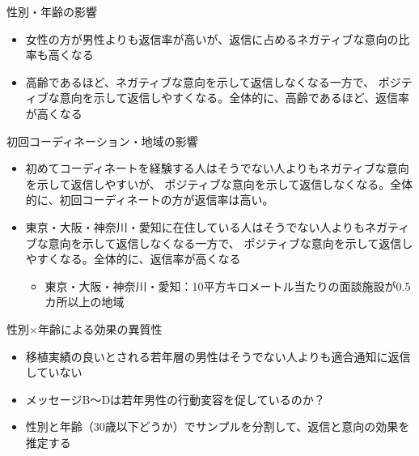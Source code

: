 \documentclass[
      aspectratio=169,
        12pt,
    ]{beamer}
\providecommand{\tightlist}{%
  \setlength{\itemsep}{0pt}\setlength{\parskip}{0pt}}
\begin{document}
\begin{frame}{性別・年齢の影響}
\protect\hypertarget{ux6027ux5225ux5e74ux9f62ux306eux5f71ux97ff}{}
\begin{itemize}
\tightlist
\item
  女性の方が男性よりも返信率が高いが、返信に占めるネガティブな意向の比率も高くなる
\item
  高齢であるほど、ネガティブな意向を示して返信しなくなる一方で、
  ポジティブな意向を示して返信しやすくなる。全体的に、高齢であるほど、返信率が高くなる
\end{itemize}
\end{frame}

\begin{frame}{初回コーディネーション・地域の影響}
\protect\hypertarget{ux521dux56deux30b3ux30fcux30c7ux30a3ux30cdux30fcux30b7ux30e7ux30f3ux5730ux57dfux306eux5f71ux97ff}{}
\begin{itemize}
\tightlist
\item
  初めてコーディネートを経験する人はそうでない人よりもネガティブな意向を示して返信しやすいが、
  ポジティブな意向を示して返信しなくなる。全体的に、初回コーディネートの方が返信率は高い。
\item
  東京・大阪・神奈川・愛知に在住している人はそうでない人よりもネガティブな意向を示して返信しなくなる一方で、
  ポジティブな意向を示して返信しやすくなる。全体的に、返信率が高くなる

  \begin{itemize}
  \tightlist
  \item
    東京・大阪・神奈川・愛知：10平方キロメートル当たりの面談施設が0.5カ所以上の地域
  \end{itemize}
\end{itemize}
\end{frame}

\begin{frame}{性別×年齢による効果の異質性}
\protect\hypertarget{ux6027ux5225ux5e74ux9f62ux306bux3088ux308bux52b9ux679cux306eux7570ux8ceaux6027}{}
\begin{itemize}
\tightlist
\item
  移植実績の良いとされる若年層の男性はそうでない人よりも適合通知に返信していない
\item
  メッセージB～Dは若年男性の行動変容を促しているのか？
\item
  性別と年齢（30歳以下どうか）でサンプルを分割して、返信と意向の効果を推定する
\end{itemize}
\end{frame}
\end{document}
